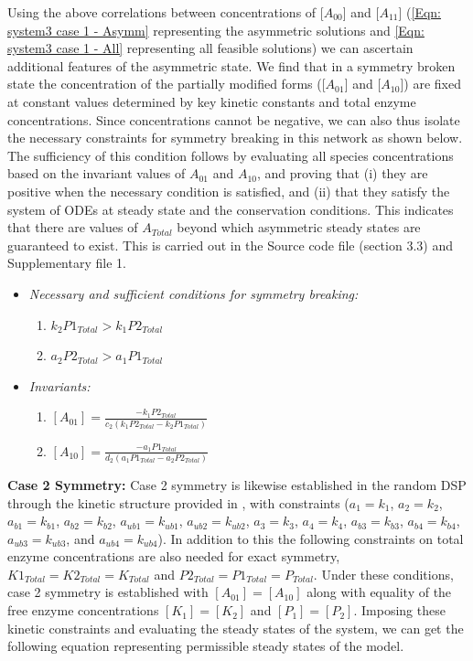 \documentclass[9pt,lineno]{elife}
\begin{document}
\begin{appendixbox}
Using the above correlations between concentrations of [$A_{00}$] and [$A_{11}$] (\cref{Eqn: system3 case 1 - Asymm} representing the asymmetric solutions and \cref{Eqn: system3 case 1 - All} representing all feasible solutions) we can ascertain additional features of the asymmetric state. We find that in a symmetry broken state the concentration of the partially modified forms ([$A_{01}$] and [$A_{10}$]) are fixed at  constant values determined by key kinetic constants and total enzyme concentrations. Since concentrations cannot be negative, we can also thus isolate the necessary constraints for symmetry breaking in this network as shown below. The sufficiency of this condition follows by evaluating all species concentrations based on the invariant values of $A_{01}$ and $A_{10}$, and proving that (i) they are positive when the necessary condition is satisfied, and (ii) that they satisfy the system of ODEs at steady state and the conservation conditions.  This indicates that there are values of $A_{Total}$ beyond which asymmetric steady states are guaranteed to exist. This is carried out in the Source code file (section 3.3) and Supplementary file 1.

\begin{itemize}
    \item \textit{Necessary and sufficient conditions for symmetry breaking:}
    \begin{enumerate}
        \item $k_2P1_{Total} > k_1P2_{Total}$
        \item $a_2P2_{Total} > a_1P1_{Total}$
    \end{enumerate}
        \item \textit{Invariants:} 
    \begin{enumerate}
        \item $[A_{01}] = \frac{-k_1P2_{Total}}{c_2(k_1P2_{Total}-k_2P1_{Total})}$
        \item $[A_{10}] = \frac{-a_1P1_{Total}}{d_2(a_1P1_{Total}-a_2P2_{Total})}$
    \end{enumerate}
\end{itemize}

\textbf{Case 2 Symmetry:} Case 2 symmetry is likewise established in the random DSP through the kinetic structure provided in , with constraints ($a_1 = k_1$, $a_2 = k_2$, $a_{b1} = k_{b1}$, $a_{b2} = k_{b2}$, $a_{ub1} = k_{ub1}$, $a_{ub2} = k_{ub2}$, $a_3 = k_3$, $a_4 = k_4$, $a_{b3} = k_{b3}$, $a_{b4} = k_{b4}$, $a_{ub3} = k_{ub3}$, and $a_{ub4} = k_{ub4}$). In addition to this the following constraints on total enzyme concentrations are also needed for exact symmetry, $K1_{Total} = K2_{Total} = K_{Total}$ and $P2_{Total} = P1_{Total} = P_{Total}$. Under these conditions, case 2 symmetry is established with $[A_{01}]=[A_{10}]$ along with equality of the free enzyme concentrations $[K_1]=[K_2]$ and $[P_1] =[P_2]$. Imposing these kinetic constraints and evaluating the steady states of the system, we can get the following equation representing permissible steady states of the model.


\end{appendixbox}
\end{document}
